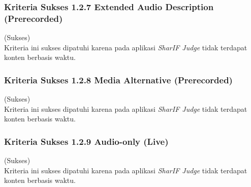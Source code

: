 \documentclass[a4paper,twoside]{article}
\begin{document}
\begin{enumerate}
		\subsubsection*{Kriteria Sukses 1.2.7 Extended Audio Description (Prerecorded)}
		\label{subsubsec:kepatuhan_kriteria_1.2.7}
		(Sukses) \\
		
		Kriteria ini sukses dipatuhi karena pada aplikasi \textit{SharIF Judge} tidak terdapat konten berbasis waktu.
		
		\subsubsection*{Kriteria Sukses 1.2.8 Media Alternative (Prerecorded)}
		\label{subsubsec:kepatuhan_kriteria_1.2.8}
		(Sukses) \\
		
		Kriteria ini sukses dipatuhi karena pada aplikasi \textit{SharIF Judge} tidak terdapat konten berbasis waktu.
		
		\subsubsection*{Kriteria Sukses 1.2.9 Audio-only (Live)}
		\label{subsubsec:kepatuhan_kriteria_1.2.9}
		(Sukses) \\
		
		Kriteria ini sukses dipatuhi karena pada aplikasi \textit{SharIF Judge} tidak terdapat konten berbasis waktu.
		

\end{enumerate}
\end{document}
